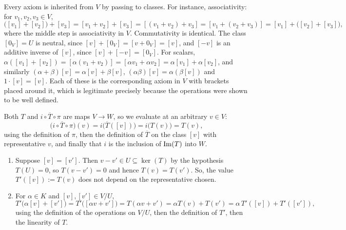 \begin{exercisesolution}
\label{sol:quotient_axioms}
Every axiom is inherited from $V$ by passing to classes. For instance, associativity: for $v_1, v_2, v_3 \in V$,
\[
\big([v_1] + [v_2]\big) + [v_3] = [v_1 + v_2] + [v_3] = [(v_1 + v_2) + v_3] = [v_1 + (v_2 + v_3)] = [v_1] + \big([v_2] + [v_3]\big),
\]
where the middle step is associativity in $V$. Commutativity is identical. The class $[0_V] = U$ is neutral, since $[v] + [0_V] = [v + 0_V] = [v]$, and $[-v]$ is an additive inverse of $[v]$, since $[v] + [-v] = [0_V]$. For scalars, $\alpha([v_1] + [v_2]) = [\alpha(v_1+v_2)] = [\alpha v_1 + \alpha v_2] = \alpha[v_1] + \alpha[v_2]$, and similarly $(\alpha + \beta)[v] = \alpha[v] + \beta[v]$, $(\alpha\beta)[v] = \alpha(\beta[v])$ and $1 \cdot [v] = [v]$. Each of these is the corresponding axiom in $V$ with brackets placed around it, which is legitimate precisely because the operations were shown to be well defined.
\end{exercisesolution}

\begin{exercisesolution}
\label{sol:first_iso_diagram}
Both $T$ and $i \circ \overline{T} \circ \pi$ are maps $V \to W$, so we evaluate at an arbitrary $v \in V$:
\[
\big(i \circ \overline{T} \circ \pi\big)(v) = i\big(\overline{T}([v])\big) = i\big(T(v)\big) = T(v),
\]
using the definition of $\pi$, then the definition of $\overline{T}$ on the class $[v]$ with representative $v$, and finally that $i$ is the inclusion of $\operatorname{Im}(T)$ into $W$.
\end{exercisesolution}

\begin{exercisesolution}
\label{sol:induced_map_well_defined}
\begin{enumerate}[label=\textbf{(\alph*)}]
    \item Suppose $[v] = [v']$. Then $v - v' \in U \subseteq \ker(T)$ by the hypothesis $T(U) = 0$, so $T(v - v') = 0$ and hence $T(v) = T(v')$. So, the value $T'([v]) := T(v)$ does not depend on the representative chosen.
    \item For $\alpha \in K$ and $[v], [v'] \in V/U$,
    \[
    T'\big(\alpha [v] + [v']\big) = T'\big([\alpha v + v']\big) = T(\alpha v + v') = \alpha T(v) + T(v') = \alpha \, T'([v]) + T'([v']),
    \]
    using the definition of the operations on $V/U$, then the definition of $T'$, then the linearity of $T$. \qedhere
\end{enumerate}
\end{exercisesolution}

